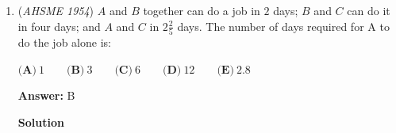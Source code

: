 \begin{enumerate}
 $\textbf{(A)}\ 1: 4\qquad\textbf{(B)}\ 1:\sqrt{2}\qquad\textbf{(C)}\ 1: 2\qquad\textbf{(D)}\ 1:\sqrt{5}\qquad\textbf{(E)}\ 1: 5$

 \textbf{Answer: }A



\textbf{Solution}

Let $\triangle ABC$ be a right triangle with right angle at $B$, $AB = 2$, and $BC = 1$. Let the altitude from $B$ to $AC$ intersect $AC$ at $D$. From the Pythagorean Theorem, $AC = \sqrt{1^2 + 2^2} = \sqrt5$, so $BD = \frac{1\cdot 2}{\sqrt5} = \frac{2\sqrt5}{5}$. Since $\triangle ADB \sim \triangle BDC \sim \triangle ABC$, $\frac{AD}{BD} = 2$ and $\frac{CD}{BD} = \frac12$. Therefore, $AD = \frac{4\sqrt5}{5}$ and $CD = \frac{\sqrt5}{5}$, so $CD:AD = \boxed{\textbf{(A) }1:4}$.

 


	\item (\textit{AHSME 1954}) $A$ and $B$ together can do a job in $2$ days; $B$ and $C$ can do it in four days; and $A$ and $C$ in $2\frac{2}{5}$ days. 
The number of days required for A to do the job alone is: 


 $\textbf{(A)}\ 1 \qquad \textbf{(B)}\ 3 \qquad \textbf{(C)}\ 6 \qquad \textbf{(D)}\ 12 \qquad \textbf{(E)}\ 2.8$

 \textbf{Answer: }B



\textbf{Solution}


\end{enumerate}
